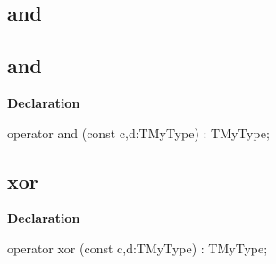 \documentclass{report}
\newif\ifpdf
\begin{document}
\subsection*{\large{\textbf{and}}\normalsize\hspace{1ex}\hrulefill}
\else
\subsection*{and}
\fi
\label{ok_operator_test-and}
\begin{list}{}{
\setlength{\itemindent}{0cm}
\setlength{\listparindent}{0cm}
\setlength{\leftmargin}{\evensidemargin}
\addtolength{\leftmargin}{\tmplength}
\settowidth{\labelsep}{X}
\addtolength{\leftmargin}{\labelsep}
\setlength{\labelwidth}{\tmplength}
}
\item[\textbf{Declaration}\hfill]
\ifpdf
\begin{flushleft}
\fi
\begin{ttfamily}
operator and (const c,d:TMyType) : TMyType;\end{ttfamily}

\ifpdf
\end{flushleft}
\fi

\end{list}
\ifpdf
\subsection*{\large{\textbf{xor}}\normalsize\hspace{1ex}\hrulefill}
\else
\subsection*{xor}
\fi
\label{ok_operator_test-xor}
\begin{list}{}{
\setlength{\itemindent}{0cm}
\setlength{\listparindent}{0cm}
\setlength{\leftmargin}{\evensidemargin}
\addtolength{\leftmargin}{\tmplength}
\settowidth{\labelsep}{X}
\addtolength{\leftmargin}{\labelsep}
\setlength{\labelwidth}{\tmplength}
}
\item[\textbf{Declaration}\hfill]
\ifpdf
\begin{flushleft}
\fi
\begin{ttfamily}
operator xor (const c,d:TMyType) : TMyType;\end{ttfamily}

\ifpdf
\end{flushleft}
\fi

\end{list}
\end{document}
